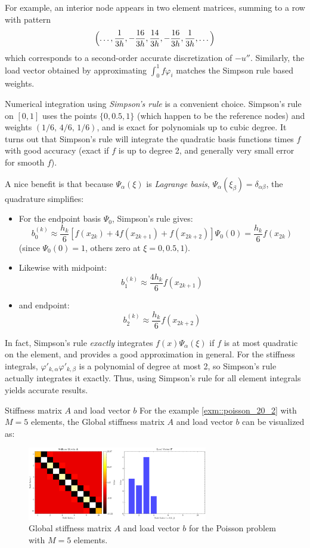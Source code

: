 \documentclass[a4paper,10pt]{article}
\begin{document}
For example, an interior node appears in two element matrices, summing to a row with pattern
\[
	\Bigl(\dots,\frac{1}{3h}, -\frac{16}{3h}, \frac{14}{3h}, -\frac{16}{3h}, \frac{1}{3h},\dots\Bigr)
\]
which corresponds to a second-order accurate discretization of \(-u''\). Similarly, the load vector obtained by approximating \(\int_0^1 f\varphi_i\) matches the Simpson rule based weights.

Numerical integration using \emph{Simpson's rule} is a convenient choice.
Simpson's rule on \([0,1]\) uses the points \(\{0, 0.5, 1\}\) (which happen to be the reference nodes) and weights \((1/6,\,4/6,\,1/6)\), and is exact for polynomials up to cubic degree.
It turns out that Simpson's rule will integrate the quadratic basis functions times \(f\) with good accuracy (exact if \(f\) is up to degree 2, and generally very small error for smooth \(f\)).

A nice benefit is that because \(\Psi_\alpha(\xi)\) is \emph{Lagrange basis}, \(\Psi_{\alpha}(\xi_\beta) = \delta_{\alpha\beta}\), the quadrature simplifies:

\begin{itemize}
	\item For the endpoint basis \(\Psi_0\), Simpson's rule gives:
	      \[
		      b^{(k)}_0 \approx \frac{h_k}{6}[f(x_{2k}) + 4f(x_{2k+1}) + f(x_{2k+2})] \Psi_0(0) = \frac{h_k}{6}f(x_{2k})
	      \]
	      (since \(\Psi_0(0)=1\), others zero at \(\xi=0,0.5,1\)).
	\item Likewise with midpoint:
	      \[
		      b^{(k)}_1 \approx \frac{4h_k}{6} f(x_{2k+1})
	      \]
	\item and endpoint:
	      \[
		      b^{(k)}_2 \approx \frac{h_k}{6} f(x_{2k+2})
	      \]
\end{itemize}

In fact, Simpson's rule \emph{exactly} integrates \(f(x)\Psi_\alpha(\xi)\) if \(f\) is at most quadratic on the element, and provides a good approximation in general.
For the stiffness integrals, \(\varphi'_{k,\alpha}\varphi'_{k,\beta}\) is a polynomial of degree at most 2, so Simpson's rule actually integrates it exactly.
Thus, using Simpson's rule for all element integrals yields accurate results.
\begin{example}{Stiffness matrix \(A\) and load vector \(b\)}{}
	For the example \ref{exm::poisson_20_2} with \(M=5\) elements, the Global stiffness matrix \(A\) and load vector \(b\) can be visualized as:
	\begin{figure}[H]
		\centering
		\includegraphics[width=0.7\textwidth]{figures/stiffness_matrix_and_load_vector_5_test.png}
		\caption{Global stiffness matrix \(A\) and load vector \(b\) for the Poisson problem with \(M=5\) elements.}
	\end{figure}
\end{example}
\end{document}
